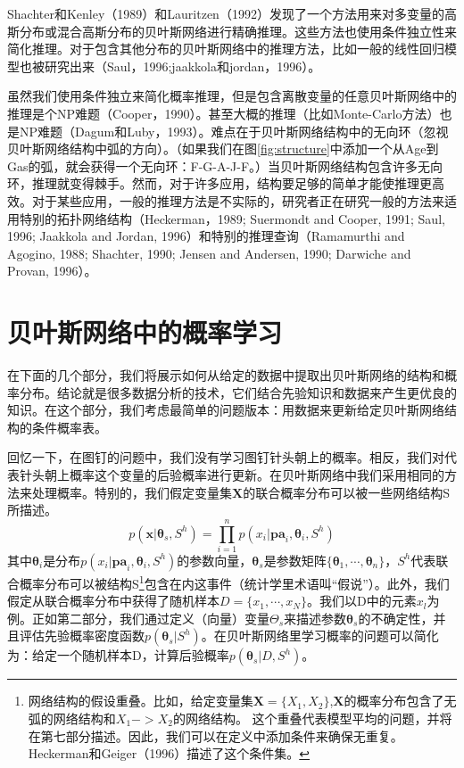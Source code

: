 \documentclass[10pt,a4paper]{article}
\begin{document}
\begin{CJK*}{UTF8}{gkai}
Shachter和Kenley（1989）和Lauritzen（1992）发现了一个方法用来对多变量的高斯分布或混合高斯分布的贝叶斯网络进行精确推理。这些方法也使用条件独立性来简化推理。对于包含其他分布的贝叶斯网络中的推理方法，比如一般的线性回归模型也被研究出来（Saul，1996;jaakkola和jordan，1996）。


虽然我们使用条件独立来简化概率推理，但是包含离散变量的任意贝叶斯网络中的推理是个NP难题（Cooper，1990）。甚至大概的推理（比如Monte-Carlo方法）也是NP难题（Dagum和Luby，1993）。难点在于贝叶斯网络结构中的无向环（忽视贝叶斯网络结构中弧的方向）。（如果我们在图\ref{fig:structure}中添加一个从Age到Gas的弧，就会获得一个无向环：F-G-A-J-F。）当贝叶斯网络结构包含许多无向环，推理就变得棘手。然而，对于许多应用，结构要足够的简单才能使推理更高效。对于某些应用，一般的推理方法是不实际的，研究者正在研究一般的方法来适用特别的拓扑网络结构（Heckerman，1989; Suermondt and Cooper, 1991; Saul, 1996; Jaakkola and
Jordan, 1996）和特别的推理查询（Ramamurthi and Agogino, 1988; Shachter, 1990; Jensen and Andersen, 1990; Darwiche and Provan, 1996）。


\section{贝叶斯网络中的概率学习}
在下面的几个部分，我们将展示如何从给定的数据中提取出贝叶斯网络的结构和概率分布。结论就是很多数据分析的技术，它们结合先验知识和数据来产生更优良的知识。在这个部分，我们考虑最简单的问题版本：用数据来更新给定贝叶斯网络结构的条件概率表。


回忆一下，在图钉的问题中，我们没有学习图钉针头朝上的概率。相反，我们对代表针头朝上概率这个变量的后验概率进行更新。在贝叶斯网络中我们采用相同的方法来处理概率。特别的，我们假定变量集$\boldsymbol{X}$的联合概率分布可以被一些网络结构S所描述。
\begin{equation}
p(\boldsymbol{x}|\boldsymbol{\theta}_s,S^h)=\prod_{i=1}^n p(x_i|\boldsymbol{pa}_i,\boldsymbol{\theta}_i,S^h)
\end{equation}
其中$\boldsymbol{\theta}_i$是分布$p(x_i|\boldsymbol{pa}_i,\boldsymbol{\theta}_i,S^h)$的参数向量，$\boldsymbol{\theta}_s$是参数矩阵$\{\boldsymbol{\theta}_1,\cdots,\boldsymbol{\theta}_n\}$，$S^h$代表联合概率分布可以被结构S\footnote{网络结构的假设重叠。比如，给定变量集$\boldsymbol{X}=\{X_1,X_2\}$,$\boldsymbol{X}$的概率分布包含了无弧的网络结构和$X_1->X_2$的网络结构。 这个重叠代表模型平均的问题，并将在第七部分描述。因此，我们可以在定义中添加条件来确保无重复。Heckerman和Geiger（1996）描述了这个条件集。}包含在内这事件（统计学里术语叫“假说”）。此外，我们假定从联合概率分布中获得了随机样本$D=\{x_1,\cdots,x_N\}$。我们以D中的元素$x_l$为例。正如第二部分，我们通过定义（向量）变量$\Theta_s$来描述参数$\boldsymbol{\theta}_s$的不确定性，并且评估先验概率密度函数$p(\boldsymbol{\theta}_s|S^h)$。在贝叶斯网络里学习概率的问题可以简化为：给定一个随机样本D，计算后验概率$p(\boldsymbol{\theta}_s|D,S^h)$。



\end{CJK*}
\end{document}
